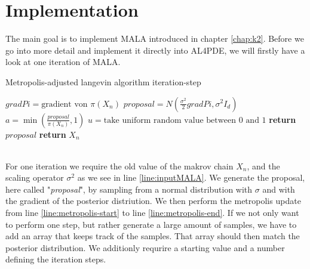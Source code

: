 \chapter{Implementation}\label{chap:implementation}
The main goal is to implement MALA introduced in chapter \ref{chap:k2}.
Before we go into more detail and implement it directly into AL4PDE, 
we will firstly have a look at one iteration of MALA.
\begin{algorithm}
    \caption{Metropolis-adjusted langevin algorithm iteration-step}
    \label{alg:MALA}
    \begin{algorithmic}[1] 
        \label{line:inputMALA}
            \State $gradPi = \text{gradient von $\pi(X_n)$}$
            \State $proposal = N(\frac{\sigma^2}{2} gradPi, \sigma^2I_d)$
            \State $a = \min(\frac{proposal}{\pi(X_n)},1)$\label{line:metropolis-start}
            \State $u = \text{take uniform random value between $0$ and $1$}$
                \State \textbf{return} $proposal$
            \EndIf
            \State \textbf{return} $X_n$\label{line:metropolis-end}
        \EndFunction
    \end{algorithmic}
\end{algorithm}
\\
For one iteration we require the old value of the makrov chain $X_n$, and 
the scaling operator $\sigma^2$ as we see in line \ref{line:inputMALA}. We generate the proposal,
here called "\textit{proposal}", by sampling from a normal distribution with 
$\sigma$ and with the gradient of the posterior distriution.
We then perform the metropolis update from line \ref{line:metropolis-start} to line \ref{line:metropolis-end}.
If we not only want to perform one step, but rather generate a large amount of samples, we have to add an
array that keeps track of the samples. That array should then match the posterior distribution.
We additionly requrire a starting value and a number defining the iteration steps.
